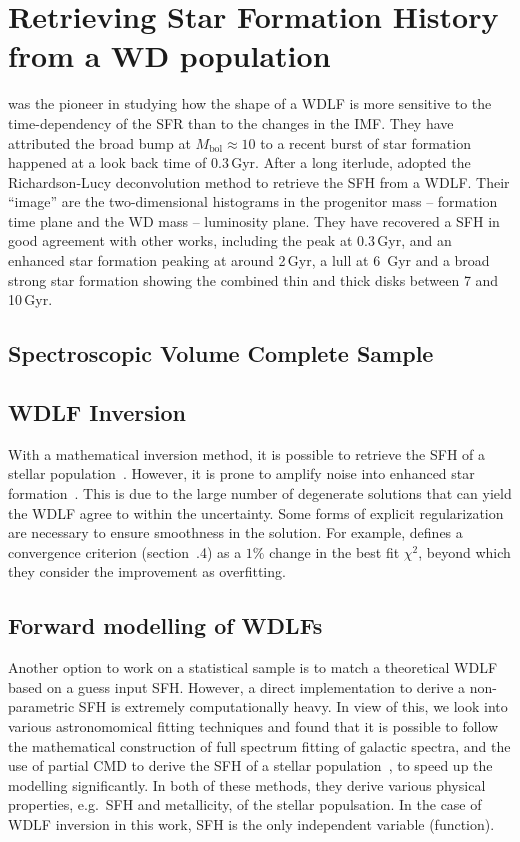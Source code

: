 \documentclass[fleqn,usenatbib]{mnras}
\begin{document}
\section{Retrieving Star Formation History from a WD population}
\citet{1990ApJ...352..605N} was the pioneer in studying how the shape of
a WDLF is more sensitive to the time-dependency of the SFR than to the changes
in the IMF. They have attributed the broad bump at $M_{\mathrm{bol}} \approx 10$
to a recent burst of star formation happened at a look back time of 0.3\,Gyr.
After a long iterlude, \citet{2011MNRAS.417...93R} adopted the Richardson-Lucy
deconvolution method to retrieve the SFH from a WDLF. Their ``image'' are the
two-dimensional histograms in the progenitor mass -- formation time plane and 
the WD mass -- luminosity plane. They have recovered a SFH in good agreement 
with other works, including the peak at 0.3\,Gyr, and an enhanced star 
formation peaking at around 2\,Gyr, a lull at 6 \,Gyr and a broad strong star 
formation showing the combined thin and thick disks between 7 and 10\,Gyr.

\subsection{Spectroscopic Volume Complete Sample}

\citep{2014ApJ...791...92T}
\citep{2019ApJ...878L..11I}


\subsection{WDLF Inversion}
With a mathematical inversion method, it is possible to retrieve the SFH of a
stellar population~\citep{2013MNRAS.434.1549R}. However, it is prone to amplify
noise into enhanced star formation~\citep{2014ApJ...791...92T}. This is due to
the large number of degenerate solutions that can yield the WDLF agree to
within the uncertainty. Some forms of explicit regularization are necessary
to ensure smoothness in the solution. For example, \citet{2013MNRAS.434.1549R}
defines a convergence criterion (section~.4)
as a $1\%$ change in the best fit $\chi^2$, beyond which they consider the
improvement as overfitting.

\subsection{Forward modelling of WDLFs}
Another option to work on a statistical sample is to match a theoretical
WDLF based on a guess input SFH. However, a direct implementation to
derive a non-parametric SFH is extremely computationally heavy. In view of
this, we look into various astronomomical fitting techniques and found that
it is possible to follow the mathematical construction of full spectrum
fitting of galactic spectra, and the use of partial CMD to derive the SFH
of a stellar population~\citep{2006A&A...459..783C}, to speed up the
modelling significantly. In both of these methods, they derive various
physical properties, e.g.\ SFH and metallicity, of the stellar populsation.
In the case of WDLF inversion in this
work, SFH is the only independent variable (function).
\end{document}
